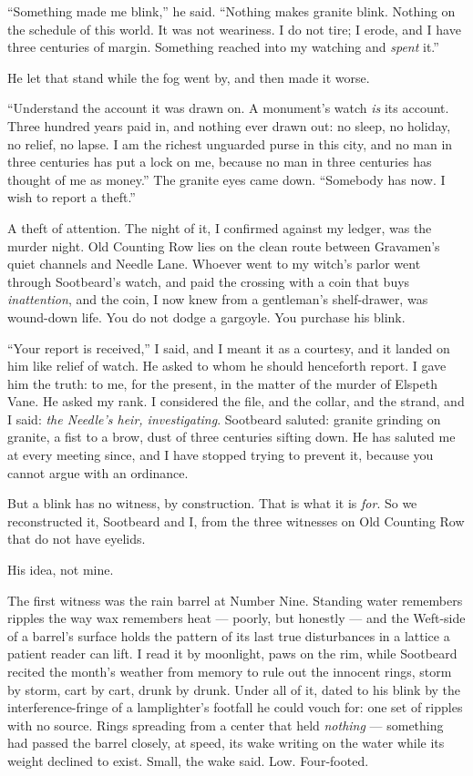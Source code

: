 ``Something made me blink,'' he said. ``Nothing makes granite blink. Nothing on the schedule of this world. It was not weariness. I do not tire; I erode, and I have three centuries of margin. Something reached into my watching and \emph{spent} it.''

He let that stand while the fog went by, and then made it worse.

``Understand the account it was drawn on. A monument's watch \emph{is} its account. Three hundred years paid in, and nothing ever drawn out: no sleep, no holiday, no relief, no lapse. I am the richest unguarded purse in this city, and no man in three centuries has put a lock on me, because no man in three centuries has thought of me as money.'' The granite eyes came down. ``Somebody has now. I wish to report a theft.''

A theft of attention. The night of it, I confirmed against my ledger, was the murder night. Old Counting Row lies on the clean route between Gravamen's quiet channels and Needle Lane. Whoever went to my witch's parlor went through Sootbeard's watch, and paid the crossing with a coin that buys \emph{inattention}, and the coin, I now knew from a gentleman's shelf-drawer, was wound-down life. You do not dodge a gargoyle. You purchase his blink.

``Your report is received,'' I said, and I meant it as a courtesy, and it landed on him like relief of watch. He asked to whom he should henceforth report. I gave him the truth: to me, for the present, in the matter of the murder of Elspeth Vane. He asked my rank. I considered the file, and the collar, and the strand, and I said: \emph{the Needle's heir, investigating}. Sootbeard saluted: granite grinding on granite, a fist to a brow, dust of three centuries sifting down. He has saluted me at every meeting since, and I have stopped trying to prevent it, because you cannot argue with an ordinance.

\scenebreak

But a blink has no witness, by construction. That is what it is \emph{for}. So we reconstructed it, Sootbeard and I, from the three witnesses on Old Counting Row that do not have eyelids.

His idea, not mine.

The first witness was the rain barrel at Number Nine. Standing water remembers ripples the way wax remembers heat --- poorly, but honestly --- and the Weft-side of a barrel's surface holds the pattern of its last true disturbances in a lattice a patient reader can lift. I read it by moonlight, paws on the rim, while Sootbeard recited the month's weather from memory to rule out the innocent rings, storm by storm, cart by cart, drunk by drunk. Under all of it, dated to his blink by the interference-fringe of a lamplighter's footfall he could vouch for: one set of ripples with no source. Rings spreading from a center that held \emph{nothing} --- something had passed the barrel closely, at speed, its wake writing on the water while its weight declined to exist. Small, the wake said. Low. Four-footed.

